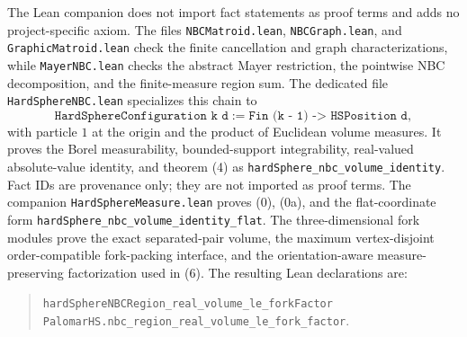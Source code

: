 \documentclass[11pt]{article}
\newcommand{\1}{\mathbf{1}}
\begin{document}
The Lean companion does not import fact statements as proof terms and adds no
project-specific axiom.  The files
\texttt{NBCMatroid.lean}, \texttt{NBCGraph.lean}, and
\texttt{GraphicMatroid.lean} check the finite cancellation and graph
characterizations, while \texttt{MayerNBC.lean} checks the abstract Mayer
restriction, the pointwise NBC decomposition, and the finite-measure region
sum.  The dedicated file \texttt{HardSphereNBC.lean} specializes this chain
to
\[
  \texttt{HardSphereConfiguration k d}
    := \texttt{Fin (k - 1) -> HSPosition d},
\]
with particle $1$ at the origin and the product of Euclidean volume measures.
It proves the Borel measurability, bounded-support integrability, real-valued
absolute-value identity, and theorem (4) as
\texttt{hardSphere\_nbc\_volume\_identity}.  Fact IDs are provenance only;
they are not imported as proof terms.  The companion
\texttt{HardSphereMeasure.lean} proves (0), (0a), and the flat-coordinate form
\texttt{hardSphere\_nbc\_volume\_identity\_flat}.  The three-dimensional fork
modules prove the exact separated-pair volume, the maximum vertex-disjoint
order-compatible fork-packing interface, and the orientation-aware
measure-preserving factorization used in (6).  The resulting Lean declarations
are:
\begin{quote}
\texttt{hardSphereNBCRegion\_real\_volume\_le\_forkFactor}\\
\texttt{PalomarHS.nbc\_region\_real\_volume\_le\_fork\_factor}.
\end{quote}
\end{document}
